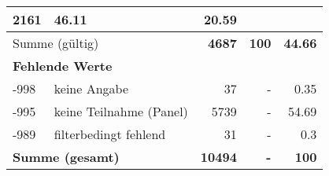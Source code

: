 \begin{longtable}{lXrrr}
       \num{2161} &
       \num[round-mode=places,round-precision=2]{46,11} &
         \num[round-mode=places,round-precision=2]{20,59} \\
     \midrule
     \multicolumn{2}{l}{Summe (gültig)} &
       \textbf{\num{4687}} &
     \textbf{100} &
       \textbf{\num[round-mode=places,round-precision=2]{44,66}} \\
     \multicolumn{5}{l}{\textbf{Fehlende Werte}}\\
       -998 &
       keine Angabe &
         \num{37} &
        - &
         \num[round-mode=places,round-precision=2]{0,35} \\
       -995 &
       keine Teilnahme (Panel) &
         \num{5739} &
        - &
         \num[round-mode=places,round-precision=2]{54,69} \\
       -989 &
       filterbedingt fehlend &
         \num{31} &
        - &
         \num[round-mode=places,round-precision=2]{0,3} \\
     \midrule
     \multicolumn{2}{l}{\textbf{Summe (gesamt)}} &
          \textbf{\num{10494}} &
        \textbf{-} &
        \textbf{100} \\
     \bottomrule
     \end{longtable}
     
